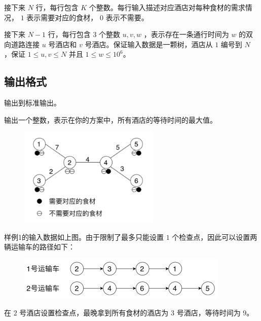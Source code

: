 接下来 $N$ 行，每行包含 $K$ 个整数。每行输入描述对应酒店对每种食材的需求情况， $1$ 表示需要对应的食材， $0$ 表示不需要。

接下来 $N-1$ 行，每行包含 $3$ 个整数 $u, v, w$ ，表示存在一条通行时间为 $w$ 的双向道路连接 $u$ 号酒店和 $v$ 号酒店。保证输入数据是一颗树，酒店从 $1$ 编号到 $N$ ，保证 $1 \le u,v \le N$ 并且 $1 \le w \le 10^{6}$。


\subsection*{输出格式}

输出到标准输出。

输出一个整数，表示在你的方案中，所有酒店的等待时间的最大值。

\examplebox*{}{}

\begin{figure}[H]
    \centering
    \includegraphics[width=0.6\textwidth]{image/21/4-p-1.png}
\end{figure}

样例1的输入数据如上图。由于限制了最多只能设置 $1$ 个检查点，因此可以设置两辆运输车的路径如下：

\begin{figure}[H]
    \centering
    \includegraphics[width=0.9\textwidth]{image/21/4-p-2.png}
\end{figure}

在 $2$ 号酒店设置检查点，最晚拿到所有食材的酒店为 $3$ 号酒店，等待时间为 $9$。

\examplebox*{}{}

